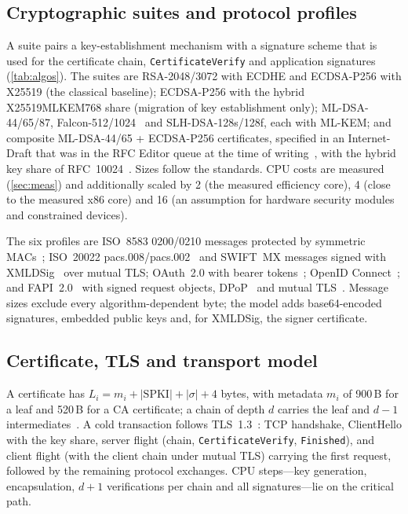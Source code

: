 \documentclass[preprint,12pt]{elsarticle}
\begin{document}
\subsection{Cryptographic suites and protocol profiles}
A suite pairs a key-establishment mechanism with a signature scheme that is used for the certificate chain, \texttt{CertificateVerify} and application signatures (\cref{tab:algos}). The suites are RSA-2048/3072 with ECDHE and ECDSA-P256 with X25519 (the classical baseline); ECDSA-P256 with the hybrid X25519MLKEM768 share (migration of key establishment only); ML-DSA-44/65/87, Falcon-512/1024~\cite{falcon2020} and SLH-DSA-128s/128f, each with ML-KEM; and composite ML-DSA-44/65 + ECDSA-P256 certificates, specified in an Internet-Draft that was in the RFC Editor queue at the time of writing~\cite{compositedraft}, with the hybrid key share of RFC~10024~\cite{hybriddraft}. Sizes follow the standards. CPU costs are measured (\cref{sec:meas}) and additionally scaled by 2 (the measured efficiency core), 4 (close to the measured x86 core) and 16 (an assumption for hardware security modules and constrained devices).

The six profiles are ISO~8583 0200/0210 messages protected by symmetric MACs~\cite{iso8583}; ISO~20022 pacs.008/pacs.002~\cite{iso20022} and SWIFT~MX messages signed with XMLDSig~\cite{xmldsig} over mutual TLS; OAuth~2.0 with bearer tokens~\cite{rfc6749,rfc6750}; OpenID Connect~\cite{oidccore}; and FAPI~2.0~\cite{fapi2} with signed request objects, DPoP~\cite{rfc9449} and mutual TLS~\cite{rfc8705}. Message sizes exclude every algorithm-dependent byte; the model adds base64-encoded signatures, embedded public keys and, for XMLDSig, the signer certificate.

\begin{table}[t]
\centering\small
\caption{Cryptographic inputs. Sizes in bytes; times are medians measured on one Cortex-X925 core (ms) with OpenSSL~3.5.4, and with liboqs~0.14.0 for Falcon. Key-establishment rows give the TLS key-share sizes and the client and server computation.}
\label{tab:algos}
\resizebox{\textwidth}{!}{}
\end{table}

\subsection{Certificate, TLS and transport model}
A certificate has $L_i=m_i+|\mathrm{SPKI}|+|\sigma|+4$ bytes, with metadata $m_i$ of 900\,B for a leaf and 520\,B for a CA certificate; a chain of depth $d$ carries the leaf and $d-1$ intermediates~\cite{rfc5280}. A cold transaction follows TLS~1.3~\cite{rfc8446}: TCP handshake, ClientHello with the key share, server flight (chain, \texttt{CertificateVerify}, \texttt{Finished}), and client flight (with the client chain under mutual TLS) carrying the first request, followed by the remaining protocol exchanges. CPU steps---key generation, encapsulation, $d{+}1$ verifications per chain and all signatures---lie on the critical path.
\end{document}
